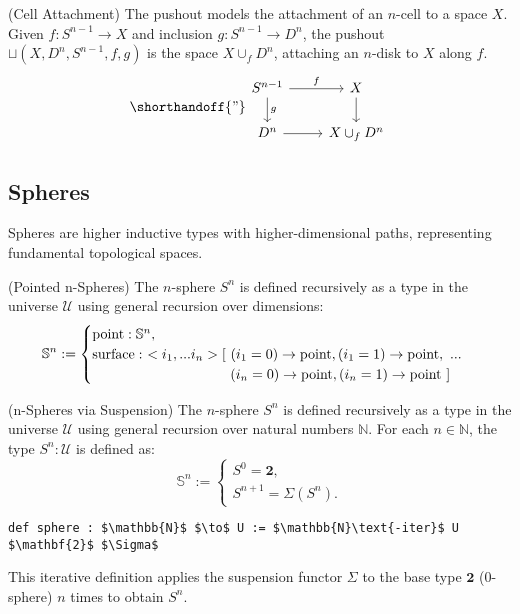 \begin{example} (Cell Attachment)
The pushout models the attachment of an \( n \)-cell to a space \( X \).
Given \( f : S^{n-1} \to X \) and inclusion \( g : S^{n-1} \to D^n \),
the pushout \( \sqcup(X,D^n,S^{n-1},f,g) \) is
the space \( X \cup_f D^n \), attaching an \( n \)-disk to \( X \) along \( f \).
\[
\shorthandoff{"}
\begin{tikzcd}
S^{n-1} \arrow[r, "f"] \arrow[d, "g"] & X \arrow[d] \\
D^n \arrow[r] & X \cup_f D^n
\end{tikzcd}
\]
\end{example}

\subsection{Spheres}
Spheres are higher inductive types with higher-dimensional paths,
representing fundamental topological spaces.

\begin{definition} (Pointed n-Spheres)
The \( n \)-sphere \( S^n \) is defined recursively as a type in
the universe \( \mathcal{U} \) using general recursion over dimensions:
\[
\mathbb{S}^n :=
\begin{cases}
\text{point} : \mathbb{S}^n, \\
\text{surface} :\ <i_1,...i_n> [\ (i_1=0) \rightarrow \text{point}, (i_1=1) \rightarrow \text{point},\ ... \\
\hspace{3.47cm} (i_n=0) \rightarrow \text{point}, (i_n=1) \rightarrow \text{point}\ ]
\end{cases}
\]
\end{definition}

\begin{definition} (n-Spheres via Suspension)
The \( n \)-sphere \( S^n \) is defined recursively as a type in
the universe \( \mathcal{U} \) using general recursion over natural
numbers \( \mathbb{N} \). For each \( n \in \mathbb{N} \),
the type \( S^n : \mathcal{U} \) is defined as:
\[
\mathbb{S}^n :=
\begin{cases}
S^0 = \mathbf{2}, \\
S^{n+1} = \Sigma(S^n).
\end{cases}
\]
\begin{lstlisting}[mathescape=true]
def sphere : $\mathbb{N}$ $\to$ U := $\mathbb{N}\text{-iter}$ U $\mathbf{2}$ $\Sigma$
\end{lstlisting}
This iterative definition applies the suspension functor \( \Sigma \)
to the base type \( \mathbf{2} \) (0-sphere) \( n \) times to obtain \( S^n \).
\end{definition}

